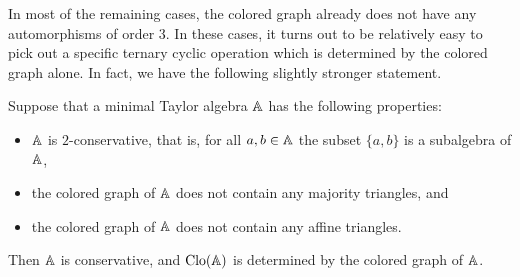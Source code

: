 \documentclass[letterpaper,11pt]{article}
\DeclareMathOperator{\Clo}{Clo}
\begin{document}
In most of the remaining cases, the colored graph already does not have any automorphisms of order $3$. In these cases, it turns out to be relatively easy to pick out a specific ternary cyclic operation which is determined by the colored graph alone. In fact, we have the following slightly stronger statement.

\begin{thm} Suppose that a minimal Taylor algebra $\mathbb{A}$ has the following properties:
\begin{itemize}
\item $\mathbb{A}$ is $2$-conservative, that is, for all $a,b \in \mathbb{A}$ the subset $\{a,b\}$ is a subalgebra of $\mathbb{A}$,
\item the colored graph of $\mathbb{A}$ does not contain any majority triangles, and
\item the colored graph of $\mathbb{A}$ does not contain any affine triangles.
\end{itemize}
Then $\mathbb{A}$ is conservative, and $\Clo(\bA)$ is determined by the colored graph of $\mathbb{A}$.
\end{thm}
\end{document}
